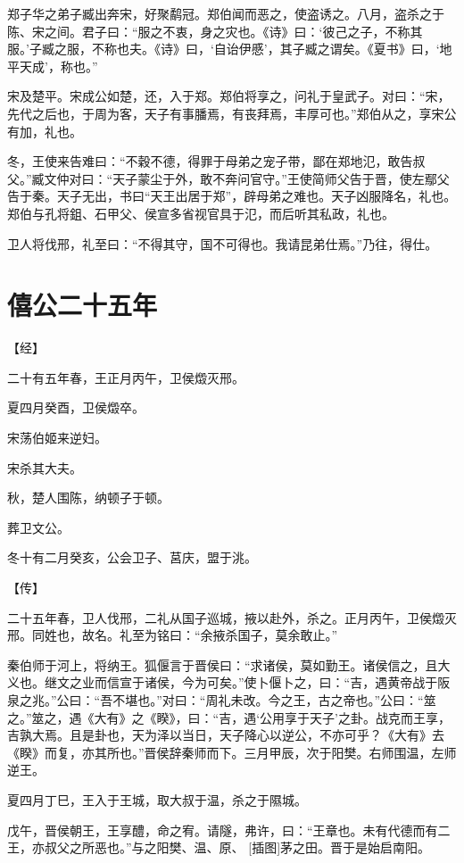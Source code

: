 \documentclass[a4paper,12pt,UTF8,twoside]{ctexbook}
\begin{document}
郑子华之弟子臧出奔宋，好聚鹬冠。郑伯闻而恶之，使盗诱之。八月，盗杀之于陈、宋之间。君子曰：“服之不衷，身之灾也。《诗》曰：‘彼己之子，不称其服。’子臧之服，不称也夫。《诗》曰，‘自诒伊慼’，其子臧之谓矣。《夏书》曰，‘地平天成’，称也。”

宋及楚平。宋成公如楚，还，入于郑。郑伯将享之，问礼于皇武子。对曰：“宋，先代之后也，于周为客，天子有事膰焉，有丧拜焉，丰厚可也。”郑伯从之，享宋公有加，礼也。

冬，王使来告难曰：“不穀不德，得罪于母弟之宠子带，鄙在郑地氾，敢告叔父。”臧文仲对曰：“天子蒙尘于外，敢不奔问官守。”王使简师父告于晋，使左鄢父告于秦。天子无出，书曰“天王出居于郑”，辟母弟之难也。天子凶服降名，礼也。郑伯与孔将鉏、石甲父、侯宣多省视官具于氾，而后听其私政，礼也。

卫人将伐邢，礼至曰：“不得其守，国不可得也。我请昆弟仕焉。”乃往，得仕。

\chapter{僖公二十五年}



【经】

二十有五年春，王正月丙午，卫侯燬灭邢。

夏四月癸酉，卫侯燬卒。

宋荡伯姬来逆妇。

宋杀其大夫。

秋，楚人围陈，纳顿子于顿。

葬卫文公。

冬十有二月癸亥，公会卫子、莒庆，盟于洮。

【传】

二十五年春，卫人伐邢，二礼从国子巡城，掖以赴外，杀之。正月丙午，卫侯燬灭邢。同姓也，故名。礼至为铭曰：“余掖杀国子，莫余敢止。”

秦伯师于河上，将纳王。狐偃言于晋侯曰：“求诸侯，莫如勤王。诸侯信之，且大义也。继文之业而信宣于诸侯，今为可矣。”使卜偃卜之，曰：“吉，遇黄帝战于阪泉之兆。”公曰：“吾不堪也。”对曰：“周礼未改。今之王，古之帝也。”公曰：“筮之。”筮之，遇《大有》之《睽》，曰：“吉，遇‘公用享于天子’之卦。战克而王享，吉孰大焉。且是卦也，天为泽以当日，天子降心以逆公，不亦可乎？《大有》去《睽》而复，亦其所也。”晋侯辞秦师而下。三月甲辰，次于阳樊。右师围温，左师逆王。

夏四月丁巳，王入于王城，取大叔于温，杀之于隰城。

戊午，晋侯朝王，王享醴，命之宥。请隧，弗许，曰：“王章也。未有代德而有二王，亦叔父之所恶也。”与之阳樊、温、原、 [插图]茅之田。晋于是始启南阳。
\end{document}
